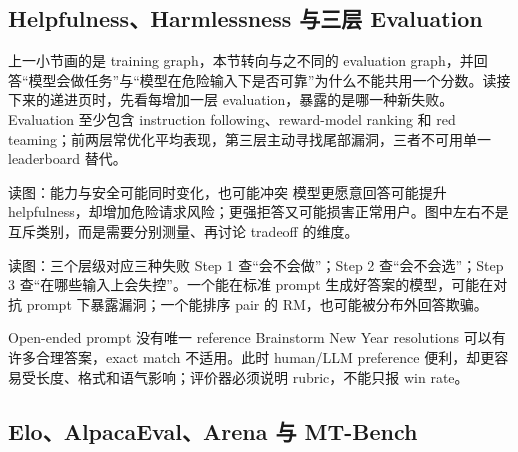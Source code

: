 \subsection{Helpfulness、Harmlessness 与三层 Evaluation}

上一小节画的是 training graph，本节转向与之不同的 evaluation graph，并回答“模型会做任务”与“模型在危险输入下是否可靠”为什么不能共用一个分数。读接下来的递进页时，先看每增加一层 evaluation，暴露的是哪一种新失败。Evaluation 至少包含 instruction following、reward-model ranking 和 red teaming；前两层常优化平均表现，第三层主动寻找尾部漏洞，三者不可用单一 leaderboard 替代。


\begin{knowledgebox}{读图：能力与安全可能同时变化，也可能冲突}
模型更愿意回答可能提升 helpfulness，却增加危险请求风险；更强拒答又可能损害正常用户。图中左右不是互斥类别，而是需要分别测量、再讨论 tradeoff 的维度。
\end{knowledgebox}


\begin{knowledgebox}{读图：三个层级对应三种失败}
Step 1 查“会不会做”；Step 2 查“会不会选”；Step 3 查“在哪些输入上会失控”。一个能在标准 prompt 生成好答案的模型，可能在对抗 prompt 下暴露漏洞；一个能排序 pair 的 RM，也可能被分布外回答欺骗。
\end{knowledgebox}


\begin{warningbox}{Open-ended prompt 没有唯一 reference}
Brainstorm New Year resolutions 可以有许多合理答案，exact match 不适用。此时 human/LLM preference 便利，却更容易受长度、格式和语气影响；评价器必须说明 rubric，不能只报 win rate。
\end{warningbox}


\subsection{Elo、AlpacaEval、Arena 与 MT-Bench}


